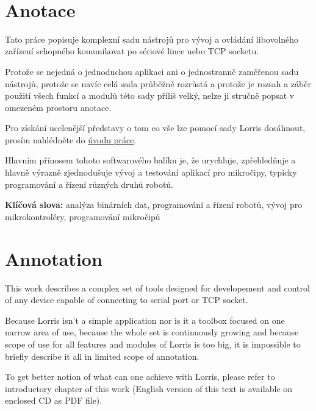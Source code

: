 \documentclass[12pt, a4paper, oneside]{article}
\newcommand{\D}{\medskip \noindent} %
\newcommand{\B}{\textbf} %
\begin{document}
\newpage   %
~ %
\vspace{-20mm}

\section*{Anotace}

Tato práce popisuje komplexní sadu nástrojů pro vývoj a ovládání libovolného zařízení schopného komunikovat po sériové lince nebo TCP socketu.

Protože se nejedná o jednoduchou aplikaci ani o jednostranně zaměřenou sadu nástrojů, protože se navíc celá sada průběžně rozrůstá a protože je rozsah a záběr použití všech funkcí a modulů této sady příliš velký, nelze ji stručně popsat v omezeném prostoru anotace.

Pro získání ucelenější představy o tom co vše lze pomocí sady Lorris dosáhnout, prosím nahlédněte do \hyperref[uvod]{úvodu práce}.


Hlavním přínosem tohoto softwarového balíku je, že urychluje, zpřehledňuje a hlavně výrazně zjednodušuje vývoj a testování aplikací pro mikročipy, typicky programování a řízení různých druhů robotů.

\D \B{Klíčová slova:} analýza binárních dat, programování a řízení robotů, vývoj pro mikrokontroléry, programování mikročipů

\section*{Annotation}

This work describes a complex set of tools designed for developement and control of any device capable of connecting to serial port or TCP socket.

Because Lorris isn't a simple application nor is it a toolbox focused on one narrow area of use, because the whole set is continuously growing and because scope of use for all features and modules of Lorris is too big, it is impossible to briefly describe it all in limited scope of annotation.

To get better notion of what can one achieve with Lorris, please refer to introductory chapter of this work (English version of this text is available on enclosed CD as PDF file).
\end{document}
